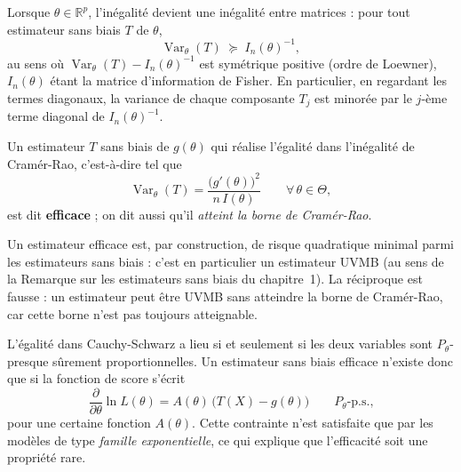 \begin{remarque}
Lorsque $\theta \in \mathbb{R}^{p}$, l'inégalité devient une inégalité entre
matrices : pour tout estimateur sans biais $T$ de $\theta$,
\[
  \operatorname{Var}_\theta(T) \;\succeq\; I_n(\theta)^{-1},
\]
au sens où $\operatorname{Var}_\theta(T) - I_n(\theta)^{-1}$ est symétrique positive
(ordre de Loewner), $I_n(\theta)$ étant la matrice d'information de Fisher. En
particulier, en regardant les termes diagonaux, la variance de chaque composante
$T_j$ est minorée par le $j$-ème terme diagonal de $I_n(\theta)^{-1}$.
\end{remarque}

\begin{mdframed}
\begin{definition}
Un estimateur $T$ sans biais de $g(\theta)$ qui réalise l'égalité dans l'inégalité
de Cramér-Rao, c'est-à-dire tel que
\[
  \operatorname{Var}_\theta(T) = \frac{\bigl(g'(\theta)\bigr)^{2}}{n\, I(\theta)}
  \qquad \forall\, \theta \in \Theta,
\]
est dit \textbf{efficace} ; on dit aussi qu'il \emph{atteint la borne de
Cramér-Rao}.
\end{definition}
\end{mdframed}

\begin{remarque}
Un estimateur efficace est, par construction, de risque quadratique minimal parmi
les estimateurs sans biais : c'est en particulier un estimateur UVMB (au sens de la
Remarque sur les estimateurs sans biais du chapitre~1). La réciproque est fausse :
un estimateur peut être UVMB sans atteindre la borne de Cramér-Rao, car cette borne
n'est pas toujours atteignable.
\end{remarque}

\begin{remarque}
L'égalité dans Cauchy-Schwarz a lieu si et seulement si les deux variables sont
$P_\theta$-presque sûrement proportionnelles. Un estimateur sans biais efficace
n'existe donc que si la fonction de score s'écrit
\[
  \frac{\partial}{\partial\theta} \ln L(\theta)
  = A(\theta)\,\bigl(T(X) - g(\theta)\bigr)
  \qquad P_\theta\text{-p.s.,}
\]
pour une certaine fonction $A(\theta)$. Cette contrainte n'est satisfaite que par
les modèles de type \emph{famille exponentielle}, ce qui explique que l'efficacité
soit une propriété rare.
\end{remarque}

